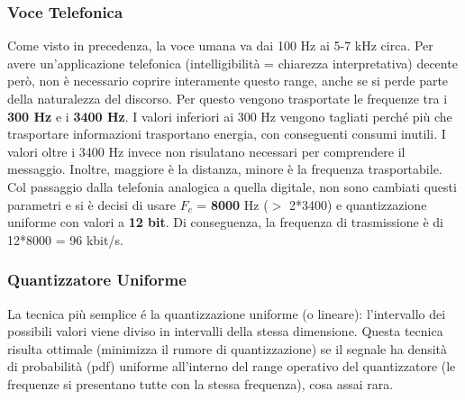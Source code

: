 \documentclass{article}
\begin{document}
			\subsubsection{Voce Telefonica}
				Come visto in precedenza, la voce umana va dai 100 Hz ai 5-7 kHz circa. Per avere un'applicazione telefonica (intelligibilità = chiarezza interpretativa) decente però, non è necessario coprire interamente questo range, anche se si perde parte della naturalezza del discorso. Per questo vengono trasportate le frequenze tra i \textbf{300 Hz} e i \textbf{3400 Hz}. I valori inferiori ai 300 Hz vengono tagliati perché più che trasportare informazioni trasportano energia, con conseguenti consumi inutili. I valori oltre i 3400 Hz invece non risulatano necessari per comprendere il messaggio. Inoltre, maggiore è la distanza, minore è la frequenza trasportabile.
				\\Col passaggio dalla telefonia analogica a quella digitale, non sono cambiati questi parametri e si è decisi di usare \textbf{$F_{c}$} = \textbf{8000} Hz ($>$ 2*3400) e quantizzazione uniforme con valori a \textbf{12 bit}. Di conseguenza, la frequenza di trasmissione è di 12*8000 = 96 kbit/s.

			\newpage
			\subsubsection{Quantizzatore Uniforme}
				La tecnica più semplice é la quantizzazione uniforme (o lineare): l’intervallo dei possibili valori viene diviso in intervalli della stessa dimensione. Questa tecnica risulta ottimale (minimizza il rumore di quantizzazione) se il segnale ha densità di probabilità (pdf) uniforme all'interno del range operativo del quantizzatore (le frequenze si presentano tutte con la stessa frequenza), cosa assai rara.
				\begin{figure}[ht!]
				\end{figure}
\end{document}
